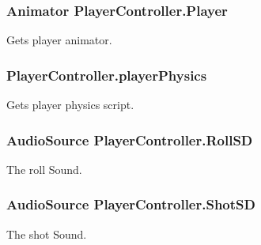 \hypertarget{classPlayerController_af6d2c371d77ff294a3840e6e26608e24}{
\subsubsection[{Player}]{\setlength{\rightskip}{0pt plus 5cm}Animator Player\-Controller.\-Player}}\label{classPlayerController_af6d2c371d77ff294a3840e6e26608e24}


Gets player animator. 

\hypertarget{classPlayerController_a039e255582f5fb656710b996fce4667e}{
\subsubsection[{player\-Physics}]{ Player\-Controller.\-player\-Physics}}\label{classPlayerController_a039e255582f5fb656710b996fce4667e}


Gets player physics script. 

\hypertarget{classPlayerController_a205f3898c18c6338d4e12f33222d90f5}{
\subsubsection[{Roll\-S\-D}]{\setlength{\rightskip}{0pt plus 5cm}Audio\-Source Player\-Controller.\-Roll\-S\-D}}\label{classPlayerController_a205f3898c18c6338d4e12f33222d90f5}


The roll Sound. 

\hypertarget{classPlayerController_aa985596607cf22753896610372c00fa7}{
\subsubsection[{Shot\-S\-D}]{\setlength{\rightskip}{0pt plus 5cm}Audio\-Source Player\-Controller.\-Shot\-S\-D}}\label{classPlayerController_aa985596607cf22753896610372c00fa7}


The shot Sound. 

